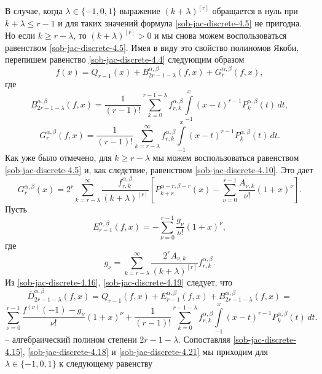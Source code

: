 В случае, когда $\lambda\in\{-1,0,1\}$ выражение $(k+\lambda)^{[r]}$
обращается в нуль при $k+\lambda\le r-1$ и для таких значений
формула \eqref{sob-jac-discrete-4.5}  не пригодна. Но если $k\ge r-\lambda$, то
$(k+\lambda)^{[r]}>0$ и мы снова можем воспользоваться равенством
\eqref{sob-jac-discrete-4.5}. Имея в виду это свойство полиномов Якоби, перепишем равенство
\eqref{sob-jac-discrete-4.4} следующим образом
\begin{equation}\label{sob-jac-discrete-4.15}
f(x)=Q_{r-1}(x)+B^{\alpha,\beta}_{2r-1-\lambda}
(f,x)+G^{\alpha,\beta}_r(f,x),
\end{equation}
где
\begin{equation}\label{sob-jac-discrete-4.16}
B^{\alpha,\beta}_{2r-1-\lambda}(f,x)=
\frac{1}{(r-1)!}\sum_{k=0}^{r-1-\lambda}f^{\alpha,\beta}_{r,k}
\int\limits^x_{-1}(x-t)^{r-1}P_k^{\alpha,\beta}(t)\,dt,
\end{equation}
\begin{equation}\label{sob-jac-discrete-4.17}
G^{\alpha,\beta}_r(f,x)=\frac{1}{(r-1)!}
\sum_{k=r-\lambda}^\infty
f^{\alpha,\beta}_{r,k}\int\limits^x_{-1}(x-t)^{r-1}
P_k^{\alpha,\beta}(t)\,dt.
\end{equation}
 Как уже было отмечено, для
$k\ge r-\lambda$ мы можем воспользоваться равенством \eqref{sob-jac-discrete-4.5} и, как
следствие, равенством \eqref{sob-jac-discrete-4.10}. Это дает
\begin{equation}\label{sob-jac-discrete-4.18}
G^{\alpha,\beta}_r(x)=
2^r\sum_{k=r-\lambda}^\infty\frac{f^{\alpha,\beta}_{r,k}}
{(k+\lambda)^{[r]}}\left[P_{k+r}^{\alpha-r,\beta-r}(x)
-\sum^{r-1}_{\nu=0}\frac{A_{\nu,k}}{\nu!}(1+x)^{\nu}\right].
\end{equation}
Пусть
\begin{equation}\label{sob-jac-discrete-4.19}
E^{\alpha,\beta}_{r-1}(f,x)=-\sum^{r-1}_{\nu=0}\frac{g_\nu}{\nu!}(1+x)^\nu,
\end{equation}
где
\begin{equation}\label{sob-jac-discrete-4.20}
g_\nu=\sum^{\infty}_{k=r-\lambda}\frac{2^rA_{\nu,k}}
{(k+\lambda)^{[r]}}f^{\alpha,\beta}_{r,k}.
\end{equation}
Из \eqref{sob-jac-discrete-4.16}, \eqref{sob-jac-discrete-4.19} следует, что
$$\overline{D}^{\alpha,\beta}_{2r-1-\lambda}(f,x)=Q_{r-1}(f,x)+
E^{\alpha,\beta}_{r-1}(f,x)+B^{\alpha,\beta}_{2r-1-\lambda}(f,x)=$$
\begin{equation}\label{sob-jac-discrete-4.21}
\sum^{r-1}_{\nu=0}\frac{f^{(\nu)}(-1)-g_\nu}{\nu!}(1+x)^\nu+\frac{1}{(r-1)!}
\sum_{k=0}^{r-1-\lambda}f^{\alpha,\beta}_{r,k}\int\limits^x_{-1}(x-t)^{r-1}P_k^{\alpha,\beta}(t)\,dt.
\end{equation}
-- алгебраический полином степени $2r-1-\lambda$. Сопоставляя
\eqref{sob-jac-discrete-4.15}, \eqref{sob-jac-discrete-4.18} и \eqref{sob-jac-discrete-4.21} мы приходим для $\lambda\in\{-1,0,1\}$ к
следующему равенству

